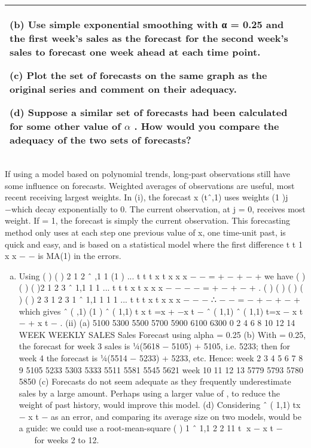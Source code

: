 \documentclass[a4paper,12pt]{article}
\begin{document}
\begin{table}[ht!]
\begin{tabular}{|p{15cm}|}
 
(b) Use simple exponential smoothing with α = 0.25 and the first week's sales as the forecast for the second week's sales to forecast
 one week ahead at each time point. 
 
(c) Plot the set of forecasts on the same graph as the original series and comment on their adequacy. 
 
(d) Suppose a similar set of forecasts had been calculated for some other value of $\alpha$ .  How would you compare the adequacy of the two sets of forecasts?  
 
 

\\ \hline



\end{tabular}
    


\end{table}



If using a model based on polynomial trends, long-past observations still have some
influence on forecasts. Weighted averages of observations are useful, most recent
receiving largest weights. In (i), the forecast x (tˆ,1) uses weights (1 )j \alpha  −\alpha  which
decay exponentially to 0. The current observation, at j = 0, receives most weight. If
\alpha  = 1, the forecast is simply the current observation. This forecasting method only
uses at each step one previous value of x, one time-unit past, is quick and easy, and is
based on a statistical model where the first difference t t 1 x x − − is MA(1) in the errors.
\begin{enumerate}[(a)]
\item  Using ( ) ( ) 2
1 2 ˆ ,1 1 (1 ) ... t t t x t \alpha  x \alpha  \alpha  x \alpha  \alpha  x − − = + − + − +
we have
( ) ( ) ( )2
1 2 3 ˆ 1,1 1 1 ... t t t x t \alpha  x \alpha  \alpha  x \alpha  \alpha  x − − − − = + − + − + .
( ) ( ) ( ) ( ) ( ) 2 3
1 2 3 1 ˆ 1,1 1 1 1 ... t t t \alpha  x t \alpha  \alpha  x \alpha  \alpha  x \alpha  \alpha  x − − − ∴ − − = − + − + − +
which gives
ˆ ( ,1) (1 ) ˆ ( 1,1) t x t =\alpha  x + −\alpha  x t −
{ ˆ ( 1,1)} ˆ ( 1,1) t=\alpha  x − x t − + x t − .
(ii) (a)
5100
5300
5500
5700
5900
6100
6300
0 2 4 6 8 10 12 14
WEEK
WEEKLY SALES
Sales
Forecast using
alpha = 0.25
(b) With \alpha  = 0.25, the forecast for week 3 sales is ¼(5618 − 5105) + 5105,
i.e. 5233; then for week 4 the forecast is ¼(5514 − 5233) + 5233, etc. Hence:
week 2 3 4 5 6 7 8 9
5105 5233 5303 5333 5511 5581 5545 5621
week 10 11 12 13
5779 5793 5780 5850
(c) Forecasts do not seem adequate as they frequently underestimate sales
by a large amount. Perhaps using a larger value of \alpha , to reduce the weight of
past history, would improve this model.
(d) Considering ˆ ( 1,1) tx − x t − as an error, and comparing its average size
on two models, would be a guide: we could use a root-mean-square
{ ( )}
1
ˆ 1,1 2 2
11
t x − x t − 
 
 
 
\sigma for weeks 2 to 12.
\end{enumerate}
\end{document}
